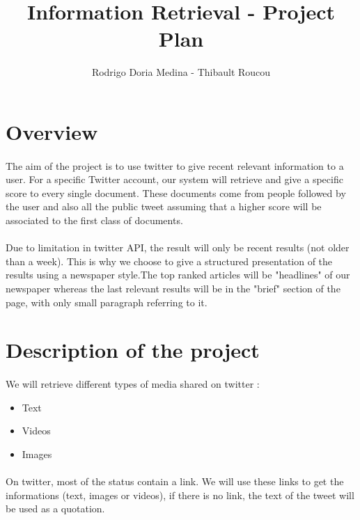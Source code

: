 \documentclass[english,7pt]{article}
\title{Information Retrieval - Project Plan}
\author{Rodrigo Doria Medina - Thibault Roucou }
\begin{document}
\maketitle


\section{Overview}

\paragraph{}The aim of the project is to use twitter to give recent relevant information to a user. For a specific Twitter account, our system will retrieve and give a specific score to every single document. These documents come from people followed by the user and also all the public tweet assuming that a higher score will be associated to the first class of documents.

\paragraph{}Due to limitation in twitter API, the result will only be recent results (not older than a week). This is why we choose  to give a structured presentation of the results  using a newspaper style.The top ranked articles will be "headlines" of our newspaper whereas the last relevant results will be in the "brief" section of the page, with only small paragraph referring to it.

\section{Description of the project}

\paragraph{}We will retrieve different types of media shared on twitter :
\begin{itemize}
    \item Text
    \item Videos
    \item Images
\end{itemize}

\paragraph{}On twitter, most of the status contain a link. We will use these links to get the informations (text, images or videos), if there is no link,  the text of the tweet will be used as a quotation. 
\end{document}
